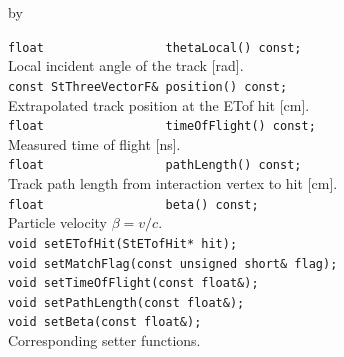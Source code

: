 \documentclass[twoside]{article}
\newcommand{\entrylabel}[1]{\mbox{\textbf{{#1}}}\hfil}%
\newenvironment{entry}
{\begin{list}{}%
    {\renewcommand{\makelabel}{\entrylabel}%
     \setlength{\labelwidth}{90pt}%
     \setlength{\leftmargin}{\labelwidth}
     \advance\leftmargin by \labelsep%
      }%
    }%
  {\end{list}}
\newcommand{\Entrylabel}[1]%
{\raisebox{0pt}[1ex][0pt]{\makebox[\labelwidth][l]%
    {\parbox[t]{\labelwidth}{\hspace{0pt}\textbf{{#1}}}}}}
\newenvironment{Entry}%
{\renewcommand{\entrylabel}{\Entrylabel}\begin{entry}}%
  {\end{entry}}
\begin{document}
\begin{Entry}
    \verb+float                 thetaLocal() const;+\\
    Local incident angle of the track [rad].\\
    \verb+const StThreeVectorF& position() const;+\\
    Extrapolated track position at the ETof hit [cm].\\
    \verb+float                 timeOfFlight() const;+\\
    Measured time of flight [ns].\\
    \verb+float                 pathLength() const;+\\
    Track path length from interaction vertex to hit [cm].\\
    \verb+float                 beta() const;+\\
    Particle velocity $\beta = v/c$.\\
    \verb+void setETofHit(StETofHit* hit);+\\
    \verb+void setMatchFlag(const unsigned short& flag);+\\
    \verb+void setTimeOfFlight(const float&);+\\
    \verb+void setPathLength(const float&);+\\
    \verb+void setBeta(const float&);+\\
    Corresponding setter functions.\\
\end{Entry}
\clearpage

\end{document}
